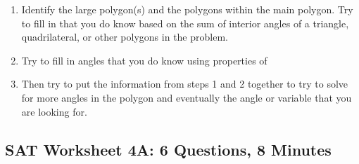 \bigskip
\begin{enumerate}[label=\arabic*)]
\item Identify the large polygon(s) and the polygons within the main polygon. Try to fill in \longline that you do know based on the sum of interior angles of a triangle, quadrilateral, or other polygons in the problem.

\bigskip\item Try to fill in angles that you do know using properties of \longline

\bigskip\item Then try to put the information from steps 1 and 2 together to try to solve for more angles in the polygon and eventually the angle or variable that you are looking for. 
\end{enumerate}

\newpage
\subsection{SAT Worksheet 4A: 6 Questions, 8 Minutes}

